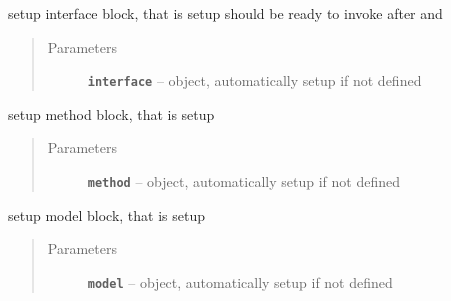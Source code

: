 \documentclass[letterpaper,10pt,english]{sphinxmanual}
\begin{document}
\begin{fulllineitems}
\begin{fulllineitems}
\begin{quote}
\begin{description}
\end{description}\end{quote}

\end{fulllineitems}


\begin{fulllineitems}
\label{src/apidocs/genopt:genopt.DakotaOC.set_interface}
setup interface block, that is setup 
should be ready to invoke after  and 
\begin{quote}\begin{description}
\item[{Parameters}] \leavevmode
\textbf{\texttt{interface}} --  object, automatically setup if not defined

\end{description}\end{quote}

\end{fulllineitems}


\begin{fulllineitems}
\label{src/apidocs/genopt:genopt.DakotaOC.set_method}
setup method block, that is setup 
\begin{quote}\begin{description}
\item[{Parameters}] \leavevmode
\textbf{\texttt{method}} --  object, automatically setup if not defined

\end{description}\end{quote}

\end{fulllineitems}


\begin{fulllineitems}
\label{src/apidocs/genopt:genopt.DakotaOC.set_model}
setup model block, that is setup 
\begin{quote}\begin{description}
\item[{Parameters}] \leavevmode
\textbf{\texttt{model}} --  object, automatically setup if not defined


\end{description}
\end{quote}
\end{fulllineitems}
\end{fulllineitems}
\end{document}
